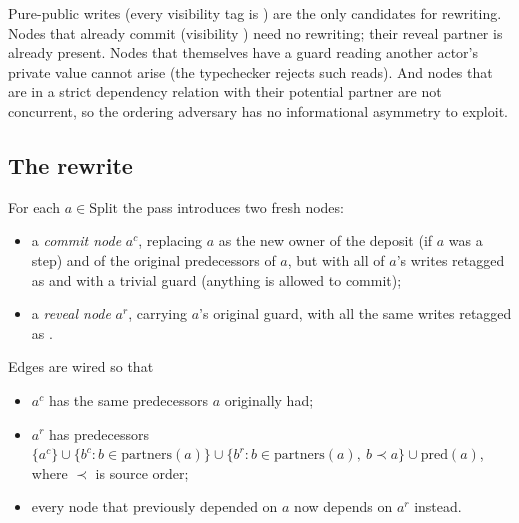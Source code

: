 Pure-public writes (every visibility tag is \PUBLIC) are the only
candidates for rewriting.  Nodes that already commit (visibility
\COMMIT) need no rewriting; their reveal partner is already
present.  Nodes that themselves have a guard reading another
actor's private value cannot arise (the typechecker rejects such
reads).  And nodes that are in a strict dependency relation with
their potential partner are not concurrent, so the ordering
adversary has no informational asymmetry to exploit.

\subsection{The rewrite}
\label{sec:cr:rewrite}

For each $a \in \mathrm{Split}$ the pass introduces two fresh
nodes:

\begin{itemize}\itemsep1pt
\item a \emph{commit node} $a^{c}$, replacing $a$ as the new owner
  of the deposit (if $a$ was a  step) and of the
  original predecessors of $a$, but with all of $a$'s \PUBLIC
  writes retagged as \COMMIT and with a trivial guard
  (anything is allowed to commit);
\item a \emph{reveal node} $a^{r}$, carrying $a$'s original guard,
  with all the same writes retagged as \REVEAL.
\end{itemize}

Edges are wired so that

\begin{itemize}\itemsep1pt
\item $a^{c}$ has the same predecessors $a$ originally had;
\item $a^{r}$ has predecessors $\{a^{c}\} \cup \{b^{c} : b \in
  \mathrm{partners}(a)\} \cup \{b^{r} : b \in \mathrm{partners}(a),\
  b \prec a\} \cup \mathrm{pred}(a)$, where $\prec$ is source order;
\item every node that previously depended on $a$ now depends on
  $a^{r}$ instead.
\end{itemize}

